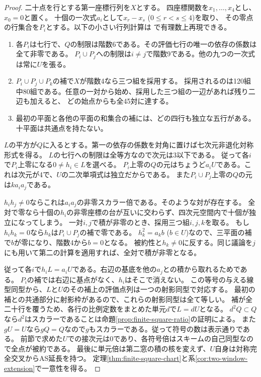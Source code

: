 \begin{proof}
二十点を行とする第一座標行列を$X$とする。
四座標関数を$x_1,\ldots,x_4$とし、$x_0=0$と置く。
十個の一次式$a_i$として$x_r-x_s$ ($0\le r<s\le4$)を取り、
その零点の行集合を$P_i$とする。以下の小さい行列計算は
で有理数上再現できる。
\begin{enumerate}
\item 各$P_i$は七行で、$Q$の制限は階数6である。その評価七行の唯一の依存の係数は全て非零である。
$P_i\cup P_j$への制限は$i\ne j$で階数9である。他の九つの一次式は常に$U$を張る。
\item $P_i\cup P_j\cup P_k$の補で$X$が階数4なら三つ組を採用する。
採用されるのは120組中80組である。任意の一対から始め、採用した三つ組の一辺があれば残り二辺も加えると、
どの始点からも全45対に達する。
\item 最初の平面と各他の平面の和集合の補には、どの四行も独立な五行がある。
十平面は共通点を持たない。
\end{enumerate}
$L$の平方が$Q$に入るとする。第一の依存の係数を対角に置けば七次元非退化対称形式を得る。
$L$の七行への制限は全等方なので次元は3以下である。
従って各$i$で$P_i$上零になる$0\ne h_i\in L$を選べる。
$P_i$上零の$Q$の元はちょうど$a_iU$である。これは次元が4で、$U$の二次単項式は独立だからである。
また$P_i\cup P_j$上零の$Q$の元は$ka_i a_j$である。

$h_i h_j\ne0$ならこれは$a_i a_j$の非零スカラー倍である。そのような対が存在する。
全対で零なら十個の$h_i$の非零座標の台が互いに交わらず、四次元空間内で十個が独立になってしまう。
一対$i,j$で積が非零のとき、採用三つ組$i,j,k$を取る。
もし$h_i h_k=0$なら$h_k$は$P_i\cup P_j$の補で零である。
$h_k^2=a_k b$ ($b\in U$)なので、三平面の補で$b$が零になり、階数4から$b=0$となる。
被約性と$h_k\ne0$に反する。同じ議論を$j$にも用いて第二の計算を適用すれば、全対で積が非零となる。

従って各$i$で$h_i L=a_i U$である。右辺の基底を他の$a_j$との積から取れるためである。
$P_i$の補では右辺に基点がなく、$h_i$はそこで消えない。
この等号の与える線型同型から、$L$と$U$のその補上の評価点列は一つの射影同型で対応する。
最初の補との共通部分に射影枠があるので、これらの射影同型は全て等しい。
補が全二十行を覆うため、各行の比例定数をまとめた単元$d$で$L=dU$となる。
$d^2Q\subset Q$なら$d^2$はスカラーであることは命題\ref{prop:finite-square-ratio}の証明による。
また$gU=U$なら$gQ=Q$なので$g$もスカラーである。従って符号の数は表示通りである。
前節で求めた$U$での接次元は0であり、各符号倍はスキームの自己同型なので全点が被約である。
最後に単元倍は第二窓の積の核を変えず、$U$自身は対称完全交叉からAS延長を持つ。
定理\ref{thm:finite-square-chart}と系\ref{cor:two-window-extension}で一意性を得る。
\end{proof}

